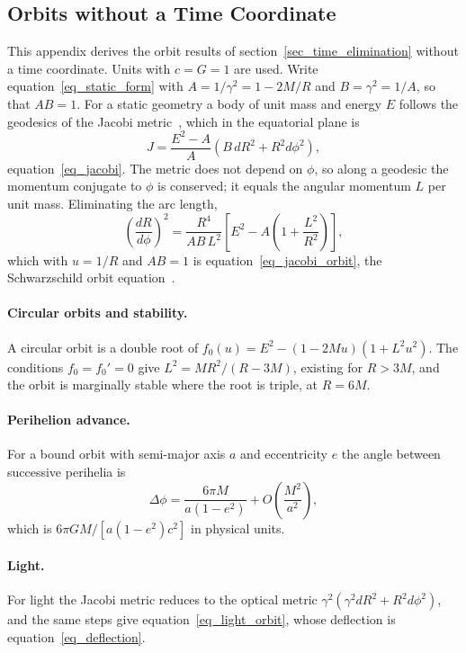 \documentclass{iopjournal}
\begin{document}
\begin{appendices}

\section{Orbits without a Time Coordinate}\label{app_orbits}

This appendix derives the orbit results of section~\ref{sec_time_elimination} without a time coordinate. Units with $c=G=1$ are used. Write equation~\eqref{eq_static_form} with $A=1/\gamma^2=1-2M/R$ and $B=\gamma^2=1/A$, so that $AB=1$. For a static geometry a body of unit mass and energy $E$ follows the geodesics of the Jacobi metric~\cite{Gibbons2016Jacobi}, which in the equatorial plane is
\begin{equation}
    J=\frac{E^2-A}{A}\left(B\,dR^2+R^2d\phi^2\right),
\end{equation}
equation~\eqref{eq_jacobi}. The metric does not depend on $\phi$, so along a geodesic the momentum conjugate to $\phi$ is conserved; it equals the angular momentum $L$ per unit mass. Eliminating the arc length,
\begin{equation}
    \left(\frac{dR}{d\phi}\right)^2=\frac{R^4}{AB\,L^2}\left[E^2-A\left(1+\frac{L^2}{R^2}\right)\right],
\end{equation}
which with $u=1/R$ and $AB=1$ is equation~\eqref{eq_jacobi_orbit}, the Schwarzschild orbit equation~\cite{MTW1973}.

\paragraph{Circular orbits and stability.} A circular orbit is a double root of $f_0(u)=E^2-(1-2Mu)(1+L^2u^2)$. The conditions $f_0=f_0'=0$ give $L^2=MR^2/(R-3M)$, existing for $R>3M$, and the orbit is marginally stable where the root is triple, at $R=6M$.

\paragraph{Perihelion advance.} For a bound orbit with semi-major axis $a$ and eccentricity $e$ the angle between successive perihelia is
\begin{equation}
    \Delta\phi=\frac{6\pi M}{a(1-e^2)}+O\!\left(\frac{M^2}{a^2}\right),
\end{equation}
which is $6\pi GM/[a(1-e^2)c^2]$ in physical units.

\paragraph{Light.} For light the Jacobi metric reduces to the optical metric $\gamma^2(\gamma^2dR^2+R^2d\phi^2)$, and the same steps give equation~\eqref{eq_light_orbit}, whose deflection is equation~\eqref{eq_deflection}.


\end{appendices}
\end{document}

